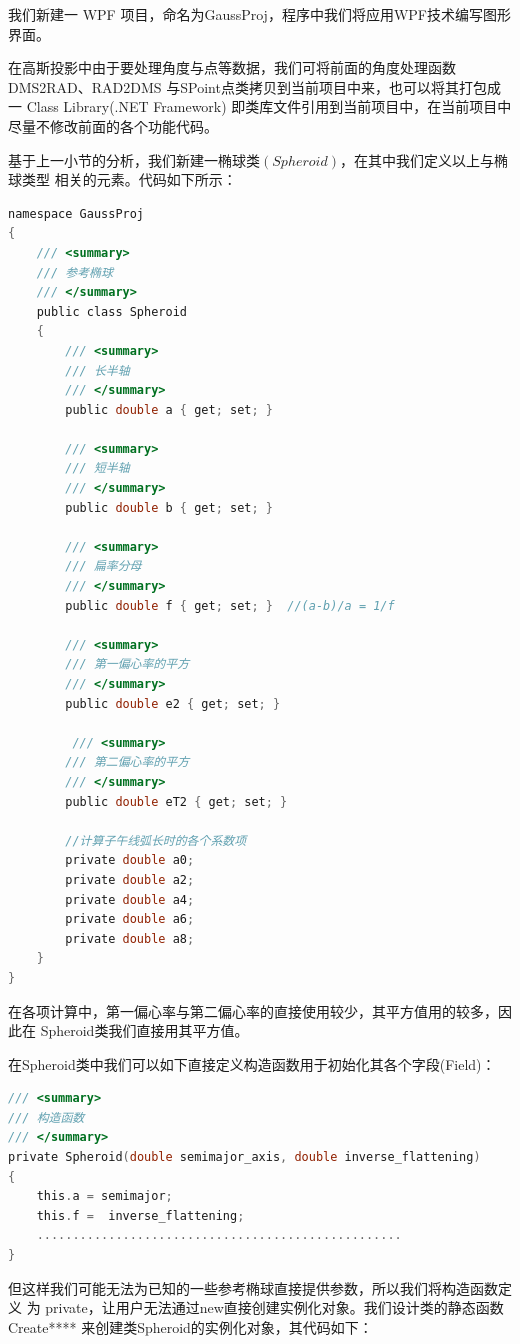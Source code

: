 我们新建一 WPF 项目，命名为GaussProj，程序中我们将应用WPF技术编写图形界面。

在高斯投影中由于要处理角度与点等数据，我们可将前面的角度处理函数DMS2RAD、RAD2DMS
与SPoint点类拷贝到当前项目中来，也可以将其打包成一 Class Library(.NET Framework)
即类库文件引用到当前项目中，在当前项目中尽量不修改前面的各个功能代码。

基于上一小节的分析，我们新建一椭球类$(Spheroid)$，在其中我们定义以上与椭球类型
相关的元素。代码如下所示：

\begin{lstlisting}[language=C]
namespace GaussProj
{
    /// <summary>
    /// 参考椭球
    /// </summary>
    public class Spheroid
    {
        /// <summary>
        /// 长半轴
        /// </summary>
        public double a { get; set; }

        /// <summary>
        /// 短半轴
        /// </summary>
        public double b { get; set; }

        /// <summary>
        /// 扁率分母
        /// </summary>
        public double f { get; set; }  //(a-b)/a = 1/f

        /// <summary>
        /// 第一偏心率的平方
        /// </summary>
        public double e2 { get; set; }

         /// <summary>
        /// 第二偏心率的平方
        /// </summary>
        public double eT2 { get; set; }

        //计算子午线弧长时的各个系数项
        private double a0;
        private double a2;
        private double a4;
        private double a6;
        private double a8;
    }
}
\end{lstlisting}

在各项计算中，第一偏心率与第二偏心率的直接使用较少，其平方值用的较多，因此在
Spheroid类我们直接用其平方值。

 在Spheroid类中我们可以如下直接定义构造函数用于初始化其各个字段(Field)：
  \begin{lstlisting}[language=C]
/// <summary>
/// 构造函数
/// </summary>
private Spheroid(double semimajor_axis, double inverse_flattening)
{
    this.a = semimajor;
    this.f =  inverse_flattening;
    ...................................................
}
\end{lstlisting}

但这样我们可能无法为已知的一些参考椭球直接提供参数，所以我们将构造函数定义
为 private，让用户无法通过new直接创建实例化对象。我们设计类的静态函数
Create**** 来创建类Spheroid的实例化对象，其代码如下：

